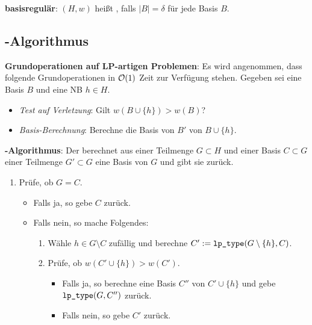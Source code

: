 \textbf{basisregulär}:
$(H, w)$ heißt , falls $|B| = \delta$ für jede Basis $B$.

\subsection{%
    -Algorithmus%
}

\textbf{Grundoperationen auf LP-artigen Problemen}:
Es wird angenommen, dass folgende Grundoperationen in $\mathcal{O}(1)$ Zeit zur Verfügung stehen.
Gegeben sei eine Basis $B$ und eine NB $h \in H$.
\begin{itemize}
    \item
    \emph{Test auf Verletzung}:
    Gilt $w(B \cup \{h\}) > w(B)$?

    \item
    \emph{Basis-Berechnung}:
    Berechne die Basis von $B'$ von $B \cup \{h\}$.
\end{itemize}

\textbf{-Algorithmus}:
Der  berechnet aus einer Teilmenge $G \subset H$ und
einer Basis $C \subset G$ einer Teilmenge $G' \subset G$ eine Basis von $G$ und gibt sie zurück.
\begin{enumerate}
    \item
    Prüfe, ob $G = C$.
    \begin{itemize}
        \item
        Falls ja, so gebe $C$ zurück.

        \item
        Falls nein, so mache Folgendes:
        \begin{enumerate}
            \item
            Wähle $h \in G \setminus C$ zufällig und
            berechne $C' := \texttt{lp\_type}(G \setminus \{h\}, C)$.

            \item
            Prüfe, ob $w(C' \cup \{h\}) > w(C')$.
            \begin{itemize}
                \item
                Falls ja, so berechne eine Basis $C''$ von $C' \cup \{h\}$
                und gebe $\texttt{lp\_type}(G, C'')$ zurück.

                \item
                Falls nein, so gebe $C'$ zurück.
            \end{itemize}
        \end{enumerate}
    \end{itemize}
\end{enumerate}

